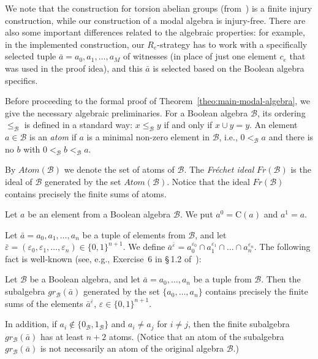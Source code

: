 \documentclass[a4paper,UKenglish,cleveref, autoref, thm-restate]{lipics-v2021}
\begin{document}
We note that the construction for torsion abelian groups (from~\cite{kalimullin_algebraic_2017}) is a finite injury construction, while our construction of a modal algebra is injury-free. There are also some important differences related to the algebraic properties: for example, in the implemented construction, our $R_e$-strategy has to work with a specifically selected tuple $\bar{a} = a_0,a_1,\dots,a_M$ of witnesses (in place of just one element $c_e$ that was used in the proof idea), and this $\bar{a}$ is selected based on the Boolean algebra specifics.




Before proceeding to the formal proof of Theorem~\ref{theo:main-modal-algebra}, we give the necessary algebraic preliminaries.
For a Boolean algebra $\mathcal{B}$, its ordering $\leq_{\mathcal{B}}$ is defined in a standard way: $x\leq_{\mathcal{B}} y$ if and only if $x\cup y = y$.
An element $a\in\mathcal{B}$ is an \emph{atom} if $a$ is a minimal non-zero element in $\mathcal{B}$, i.e., $0 <_{\mathcal{B}} a$ and there is no $b$ with $0 <_{\mathcal{B}} b <_{\mathcal{B}} a$. 

By $Atom(\mathcal{B})$ we denote the set of atoms of $\mathcal{B}$.
The \emph{Fr{\'e}chet ideal} $Fr(\mathcal{B})$ is the ideal of $\mathcal{B}$ generated by the set $Atom(\mathcal{B})$. Notice that the ideal $Fr(\mathcal{B})$ contains precisely the finite sums of atoms.




Let $a$ be an element from a Boolean algebra $\mathcal{B}$. We put
	$a^0 = \mathrm{C}(a)$ and 
        $a^1  = a$.

Let $\bar a = a_0,a_1,\dots,a_n$ be a tuple of elements from $\mathcal{B}$, and let $\bar{\varepsilon} = (\varepsilon_0, \varepsilon_1, \dots, \varepsilon_n) \in \{ 0,1\}^{n+1}$. We define
	$
		\bar a^{\bar \varepsilon} = a_0^{\varepsilon_0} \cap a_1^{\varepsilon_1} \cap \dots \cap a_n^{\varepsilon_n}.
	$
The following fact is well-known (see, e.g., Exercise~6 in \S\,1.2 of~\cite{Goncharov-Book}):

\begin{lemma}\label{lemma:generating}
	Let $\mathcal{B}$ be a Boolean algebra, and let $\bar a = a_0,\dots,a_n$ be a tuple from $\mathcal{B}$. Then the subalgebra $gr_{\mathcal{B}}(\bar a)$ generated by the set $\{ a_0,\dots,a_n\}$ contains precisely the finite sums of the elements $\bar a^{\bar\varepsilon}$, $\varepsilon \in \{ 0,1\}^{n+1}$. 
	
	In addition, if $a_i \not\in \{ 0_{\mathcal{B}},1_{\mathcal{B}} \}$ and $a_i\neq a_j$ for $i\neq j$, then the finite subalgebra $gr_{\mathcal{B}}(\bar a)$ has at least $n+2$ atoms. (Notice that an atom of the subalgebra $gr_{\mathcal{B}}(\bar a)$ is not necessarily an atom of the original algebra $\mathcal{B}$.)
\end{lemma}
\end{document}
